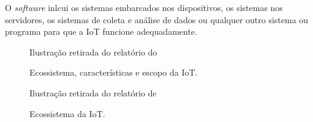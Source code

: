 \documentclass[pdftex, brazil, 12pt, twoside]{article}
\newcommand{\ingles}[1]{\textit{#1}}
\begin{document}
O \ingles{software} inlcui os sistemas embarcados nos dispositivos, os sistemas
nos servidores, os sistemas de coleta e análise de dados ou qualquer outro
sistema ou programa para que a IoT funcione adequadamente.

\begin{figure}[H]
  \begin{center}
    \caption{Ecossistema, características e escopo da IoT.}
    \label{fig:ecossistema1}
    
    \footnotesize{Ilustração retirada do relatório do~\citet{IEEEIoTDefinition}}
  \end{center}
\end{figure}

\begin{figure}[H]
  \begin{center}
    \caption{Ecossistema da IoT.}
    \label{fig:ecossistema2}
    
    \footnotesize{Ilustração retirada do relatório de~\citet{UKGOSWalportIoT2014}}
  \end{center}
\end{figure}
\end{document}
